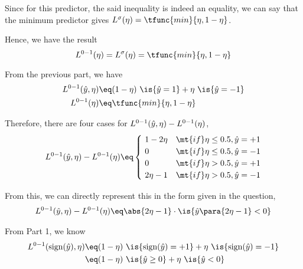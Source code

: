 \documentclass[a4paper,10pt]{article}
\begin{document}
\begin{question}
\begin{qpart}{1}
		Since for this predictor, the said inequality is indeed an equality, we can say that the minimum predictor gives $L^{\sigma}(\eta) = \tfunc{min}{\eta, 1 - \eta}$.

		Hence, we have the result
		\begin{equation}
			L^{0-1}(\eta) = L^{\sigma}(\eta) = \tfunc{min}{\eta, 1 - \eta}
			\label{eq:q1-p1}
		\end{equation}

	\end{qpart}

	\begin{qpart}{2}

		From the previous part, we have
		\begin{align*}
			L^{0-1}(\wy, \eta)	&\eq	(1 - \eta)\ \is{\wy = 1} + \eta\ \is{\wy = -1} \\
			L^{0-1}(\eta)		&\eq	\tfunc{min}{\eta, 1 - \eta}
		\end{align*}

		Therefore, there are four cases for $L^{0-1}(\hat{y}, \eta) - L^{0-1}(\eta)$,
		\begin{align*}
			L^{0-1}(\wy, \eta) - L^{0-1}(\eta)	\eq	\begin{cases}
				\ 1 - 2 \eta	& \mt{if} \eta \le 0.5, \wy = +1 \\
				\ 0				& \mt{if} \eta \le 0.5, \wy = -1 \\
				\ 0				& \mt{if} \eta  >  0.5, \wy = +1 \\
				\ 2 \eta - 1	& \mt{if} \eta  >  0.5, \wy = -1 \\
			\end{cases}
		\end{align*}

		From this, we can directly represent this in the form given in the question, \ie
		\begin{align*}
			L^{0-1}(\wy, \eta) - L^{0-1}(\eta)	\eq	\abs{2 \eta - 1} \cdot \is{\wy \para{2 \eta - 1} < 0}
		\end{align*}

	\end{qpart}

	\begin{qpart}{3}

		From Part 1, we know
		\begin{align*}
			L^{0-1}(\sgn(\wy), \eta)	&\eq	(1 - \eta)\ \is{\sgn(\wy) = +1} + \eta\ \is{\sgn(\wy) = -1} \\
			&\eq	(1 - \eta)\ \is{\wy \ge 0} + \eta\ \is{\wy < 0}
		\end{align*}


\end{qpart}
\end{question}
\end{document}
